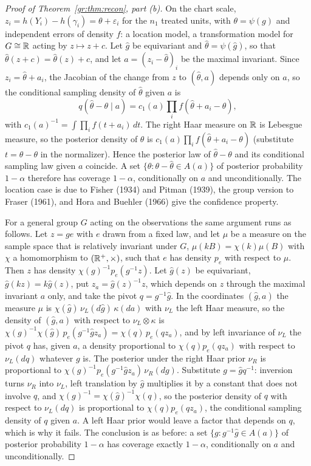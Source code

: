 \begin{proof}[Proof of Theorem~\ref{gr:thm:recon}, part (b)]
On the chart scale, $z_i=h(Y_i)-h(\gamma_i)=\theta+\varepsilon_i$ for the $n_1$ treated units, with $\theta=\psi(g)$ and independent errors of density $f$: a location model, a transformation model for $G\cong\mathbb{R}$ acting by $z\mapsto z+c$. Let $\hat g$ be equivariant and $\hat\theta=\psi(\hat g)$, so that $\hat\theta(z+c)=\hat\theta(z)+c$, and let $a=(z_i-\hat\theta)_i$ be the maximal invariant. Since $z_i=\hat\theta+a_i$, the Jacobian of the change from $z$ to $(\hat\theta,a)$ depends only on $a$, so the conditional sampling density of $\hat\theta$ given $a$ is
\[
q(\hat\theta-\theta\mid a)=c_1(a)\prod_if(\hat\theta+a_i-\theta),
\]
with $c_1(a)^{-1}=\int\prod_if(t+a_i)\,dt$. The right Haar measure on $\mathbb{R}$ is Lebesgue measure, so the posterior density of $\theta$ is $c_1(a)\prod_if(\hat\theta+a_i-\theta)$ (substitute $t=\hat\theta-\theta$ in the normalizer). Hence the posterior law of $\hat\theta-\theta$ and its conditional sampling law given $a$ coincide. A set $\{\theta:\theta-\hat\theta\in A(a)\}$ of posterior probability $1-\alpha$ therefore has coverage $1-\alpha$, conditionally on $a$ and unconditionally. The location case is due to Fisher (1934) and Pitman (1939), the group version to Fraser (1961), and Hora and Buehler (1966) give the confidence property.

For a general group $G$ acting on the observations the same argument runs as follows. Let $z=ge$ with $e$ drawn from a fixed law, and let $\mu$ be a measure on the sample space that is relatively invariant under $G$, $\mu(kB)=\chi(k)\mu(B)$ with $\chi$ a homomorphism to $(\mathbb{R}^{+},\times)$, such that $e$ has density $p_e$ with respect to $\mu$. Then $z$ has density $\chi(g)^{-1}p_e(g^{-1}z)$. Let $\hat g(z)$ be equivariant, $\hat g(kz)=k\hat g(z)$, put $z_a=\hat g(z)^{-1}z$, which depends on $z$ through the maximal invariant $a$ only, and take the pivot $q=g^{-1}\hat g$. In the coordinates $(\hat g,a)$ the measure $\mu$ is $\chi(\hat g)\,\nu_L(d\hat g)\,\kappa(da)$ with $\nu_L$ the left Haar measure, so the density of $(\hat g,a)$ with respect to $\nu_L\otimes\kappa$ is $\chi(g)^{-1}\chi(\hat g)\,p_e(g^{-1}\hat gz_a)=\chi(q)\,p_e(qz_a)$, and by left invariance of $\nu_L$ the pivot $q$ has, given $a$, a density proportional to $\chi(q)p_e(qz_a)$ with respect to $\nu_L(dq)$ whatever $g$ is. The posterior under the right Haar prior $\nu_R$ is proportional to $\chi(g)^{-1}p_e(g^{-1}\hat gz_a)\,\nu_R(dg)$. Substitute $g=\hat gq^{-1}$: inversion turns $\nu_R$ into $\nu_L$, left translation by $\hat g$ multiplies it by a constant that does not involve $q$, and $\chi(g)^{-1}=\chi(\hat g)^{-1}\chi(q)$, so the posterior density of $q$ with respect to $\nu_L(dq)$ is proportional to $\chi(q)p_e(qz_a)$, the conditional sampling density of $q$ given $a$. A left Haar prior would leave a factor that depends on $q$, which is why it fails. The conclusion is as before: a set $\{g:g^{-1}\hat g\in A(a)\}$ of posterior probability $1-\alpha$ has coverage exactly $1-\alpha$, conditionally on $a$ and unconditionally.
\end{proof}


